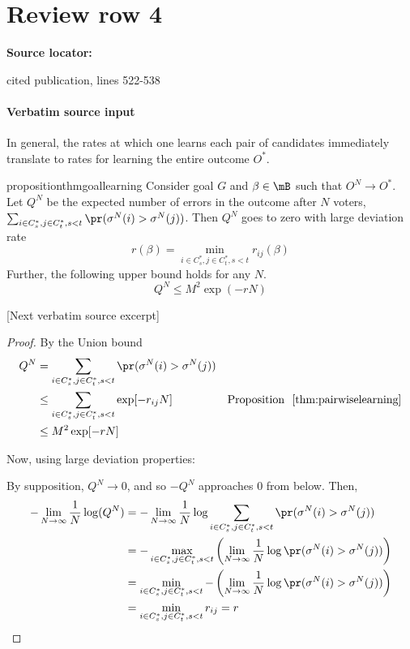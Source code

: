 \documentclass[10pt]{article}
\begin{document}
\section*{Review row 4}
\textbf{Source locator:} {\footnotesize\raggedright cited publication, lines 522-\allowbreak{}538\par}
\paragraph{Verbatim source input}
\begin{ReviewVerbatim}
In general, the rates at which one learns each pair of candidates immediately translate to rates for learning the entire outcome $O^*$.

\begin{restatable}{proposition}{thmgoallearning}
	\label{thm:goal_learning}
	Consider goal $G$ and $\beta\in\mB$ such that $O^N \to O^*$. Let $Q^N$ be the expected number of errors in the outcome after $N$ voters, $\sum_{i\in C_s^*,j\in C_t^*, s < t} \pr(\sigma^N(i)>\sigma^N(j))$. Then $Q^N$ goes to zero with large deviation rate
%
	\[
	r(\beta) = \min_{i\in C_s^*,j\in C_t^*, s < t} r_{ij}(\beta) \label{eqnpart:outcomerate}
	\]
	Further, the following upper bound holds for any $N$. \[Q^N \leq M^2 \exp(-rN)\] %
%
%
%

%
\end{restatable}

[Next verbatim source excerpt]

\thmgoallearning*
\begin{proof}
%
%

By the Union bound
\begin{align*}
%
Q^N &= \sum_{i\in C_s^*,j\in C_t^*, s < t} \pr(\sigma^N(i) > \sigma^N(j)) \\
%
&\leq \sum_{i\in C_s^*,j\in C_t^*, s < t} \exp[-r_{ij}N] & \text{Proposition }~\ref{thm:pairwiselearning}\\
&\leq M^2  \exp[-rN]\\
%
%
%
%
%
%
\end{align*}

%
Now, using large deviation properties:

%
By supposition, $Q^N \to 0$, and so $-Q^N$ approaches $0$ from below.
%
Then,
\begin{align}
%
-\lim_{N\to\infty} \frac{1}{N}\log(Q^N)
&=  -\lim_{N\to\infty} \frac{1}{N}\log \sum_{i\in C_s^*,j\in C_t^*, s < t} \pr(\sigma^N(i) > \sigma^N(j))\nonumber\\
&= -\max_{i\in C_s^*,j\in C_t^*, s < t}\left(\lim_{N\to\infty} \frac{1}{N}\log \pr(\sigma^N(i) > \sigma^N(j))\right)\label{eqnstep:ldpproperty}\\
&= \min_{i\in C_s^*,j\in C_t^*, s < t}-\left(\lim_{N\to\infty} \frac{1}{N}\log \pr(\sigma^N(i) > \sigma^N(j))\right)\nonumber\\
&= \min_{i\in C_s^*,j\in C_t^*, s < t} r_{ij} = r\nonumber
\end{align}


\end{proof}
\end{ReviewVerbatim}
\end{document}
